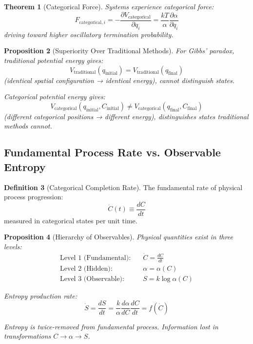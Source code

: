 \documentclass[11pt,a4paper]{article}
\newtheorem{theorem}{Theorem}[section]
\newtheorem{proposition}[theorem]{Proposition}
\theoremstyle{definition}
\newtheorem{definition}[theorem]{Definition}
\theoremstyle{remark}
\begin{document}
\begin{theorem}[Categorical Force]
Systems experience categorical force:
\begin{equation}
F_{\text{categorical},i} = -\frac{\partial V_{\text{categorical}}}{\partial q_i} = \frac{kT}{\alpha} \frac{\partial \alpha}{\partial q_i}
\end{equation}
driving toward higher oscillatory termination probability.
\end{theorem}

\begin{proposition}[Superiority Over Traditional Methods]
For Gibbs' paradox, traditional potential energy gives:
\begin{equation}
V_{\text{traditional}}(q_{\text{initial}}) = V_{\text{traditional}}(q_{\text{final}})
\end{equation}
(identical spatial configuration → identical energy), \textit{cannot distinguish states}.

Categorical potential energy gives:
\begin{equation}
V_{\text{categorical}}(q_{\text{initial}}, C_{\text{initial}}) \neq V_{\text{categorical}}(q_{\text{final}}, C_{\text{final}})
\end{equation}
(different categorical positions → different energy), \textit{distinguishes states traditional methods cannot}.
\end{proposition}

\subsection{Fundamental Process Rate vs. Observable Entropy}

\begin{definition}[Categorical Completion Rate]
The fundamental rate of physical process progression:
\begin{equation}
\dot{C}(t) \equiv \frac{dC}{dt}
\label{eq:fundamental_rate}
\end{equation}
measured in categorical states per unit time.
\end{definition}

\begin{proposition}[Hierarchy of Observables]
Physical quantities exist in three levels:
\begin{align}
\text{Level 1 (Fundamental)}: \quad & \dot{C} = \frac{dC}{dt} \\
\text{Level 2 (Hidden)}: \quad & \alpha = \alpha(C) \\
\text{Level 3 (Observable)}: \quad & S = k \log \alpha(C)
\end{align}

Entropy production rate:
\begin{equation}
\dot{S} = \frac{dS}{dt} = \frac{k}{\alpha} \frac{d\alpha}{dC} \frac{dC}{dt} = f(\dot{C})
\end{equation}

Entropy is \textit{twice-removed} from fundamental process. Information lost in transformations $C \to \alpha \to S$.
\end{proposition}
\end{document}
